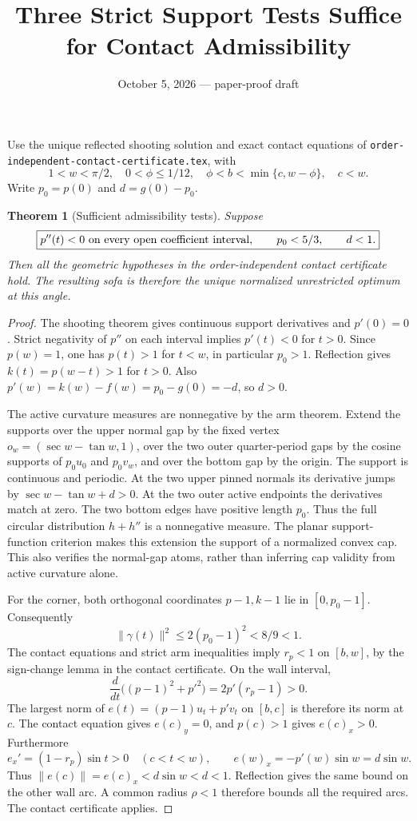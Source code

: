 \documentclass[11pt]{article}
\title{Three Strict Support Tests Suffice for Contact Admissibility}
\author{}\date{October 5, 2026 --- paper-proof draft}
\newtheorem{theorem}{Theorem}
\begin{document}
\maketitle
Use the unique reflected shooting solution and exact contact equations of \texttt{order-independent-contact-certificate.tex}, with
\[
 1<w<\pi/2,\quad0<\phi\le1/12,\quad
 \phi<b<\min\{c,w-\phi\},\quad c<w.
\]
Write $p_0=p(0)$ and $d=g(0)-p_0$.

\begin{theorem}[Sufficient admissibility tests]
Suppose
\[
 \boxed{p''(t)<0\ \hbox{on every open coefficient interval},\qquad
 p_0<5/3,\qquad d<1.}
\]
Then all the geometric hypotheses in the order-independent contact certificate hold. The resulting sofa is therefore the unique normalized unrestricted optimum at this angle.
\end{theorem}
\begin{proof}
The shooting theorem gives continuous support derivatives and $p'(0)=0$. Strict negativity of $p''$ on each interval implies $p'(t)<0$ for $t>0$. Since $p(w)=1$, one has $p(t)>1$ for $t<w$, in particular $p_0>1$. Reflection gives $k(t)=p(w-t)>1$ for $t>0$. Also $p'(w)=k(w)-f(w)=p_0-g(0)=-d$, so $d>0$.

The active curvature measures are nonnegative by the arm theorem. Extend the supports over the upper normal gap by the fixed vertex $o_w=(\sec w-\tan w,1)$, over the two outer quarter-period gaps by the cosine supports of $p_0u_0$ and $p_0v_w$, and over the bottom gap by the origin. The support is continuous and periodic. At the two upper pinned normals its derivative jumps by $\sec w-\tan w+d>0$. At the two outer active endpoints the derivatives match at zero. The two bottom edges have positive length $p_0$. Thus the full circular distribution $h+h''$ is a nonnegative measure. The planar support-function criterion makes this extension the support of a normalized convex cap. This also verifies the normal-gap atoms, rather than inferring cap validity from active curvature alone.

For the corner, both orthogonal coordinates $p-1,k-1$ lie in $[0,p_0-1]$. Consequently
\[
 \|\gamma(t)\|^2\le2(p_0-1)^2<8/9<1.
\]
The contact equations and strict arm inequalities imply $r_p<1$ on $[b,w]$, by the sign-change lemma in the contact certificate. On the wall interval,
\[
 \frac{d}{dt}\bigl((p-1)^2+p'^2\bigr)=2p'(r_p-1)>0.
\]
The largest norm of $e(t)=(p-1)u_t+p'v_t$ on $[b,c]$ is therefore its norm at $c$. The contact equation gives $e(c)_y=0$, and $p(c)>1$ gives $e(c)_x>0$. Furthermore
\[
 e_x'=(1-r_p)\sin t>0\quad(c<t<w),\qquad
 e(w)_x=-p'(w)\sin w=d\sin w.
\]
Thus $\|e(c)\|=e(c)_x<d\sin w<d<1$. Reflection gives the same bound on the other wall arc. A common radius $\rho<1$ therefore bounds all the required arcs. The contact certificate applies.
\end{proof}
\end{document}
